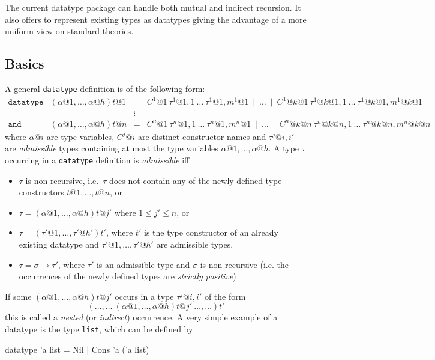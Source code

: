 The current datatype package can handle both mutual and indirect recursion.
It also offers to represent existing types as datatypes giving the advantage
of a more uniform view on standard theories.


\subsection{Basics}
\label{subsec:datatype:basics}

A general \texttt{datatype} definition is of the following form:
\[
\begin{array}{llcl}
\mathtt{datatype} & (\alpha@1,\ldots,\alpha@h)t@1 & = &
  C^1@1~\tau^1@{1,1}~\ldots~\tau^1@{1,m^1@1} ~\mid~ \ldots ~\mid~
    C^1@{k@1}~\tau^1@{k@1,1}~\ldots~\tau^1@{k@1,m^1@{k@1}} \\
 & & \vdots \\
\mathtt{and} & (\alpha@1,\ldots,\alpha@h)t@n & = &
  C^n@1~\tau^n@{1,1}~\ldots~\tau^n@{1,m^n@1} ~\mid~ \ldots ~\mid~
    C^n@{k@n}~\tau^n@{k@n,1}~\ldots~\tau^n@{k@n,m^n@{k@n}}
\end{array}
\]
where $\alpha@i$ are type variables, $C^j@i$ are distinct constructor
names and $\tau^j@{i,i'}$ are {\em admissible} types containing at
most the type variables $\alpha@1, \ldots, \alpha@h$. A type $\tau$
occurring in a \texttt{datatype} definition is {\em admissible} iff
\begin{itemize}
\item $\tau$ is non-recursive, i.e.\ $\tau$ does not contain any of the
newly defined type constructors $t@1,\ldots,t@n$, or
\item $\tau = (\alpha@1,\ldots,\alpha@h)t@{j'}$ where $1 \leq j' \leq n$, or
\item $\tau = (\tau'@1,\ldots,\tau'@{h'})t'$, where $t'$ is
the type constructor of an already existing datatype and $\tau'@1,\ldots,\tau'@{h'}$
are admissible types.
\item $\tau = \sigma \rightarrow \tau'$, where $\tau'$ is an admissible
type and $\sigma$ is non-recursive (i.e. the occurrences of the newly defined
types are {\em strictly positive})
\end{itemize}
If some $(\alpha@1,\ldots,\alpha@h)t@{j'}$ occurs in a type $\tau^j@{i,i'}$
of the form
\[
(\ldots,\ldots ~ (\alpha@1,\ldots,\alpha@h)t@{j'} ~ \ldots,\ldots)t'
\]
this is called a {\em nested} (or \emph{indirect}) occurrence. A very simple
example of a datatype is the type \texttt{list}, which can be defined by
\begin{ttbox}
datatype 'a list = Nil
                 | Cons 'a ('a list)
\end{ttbox}

